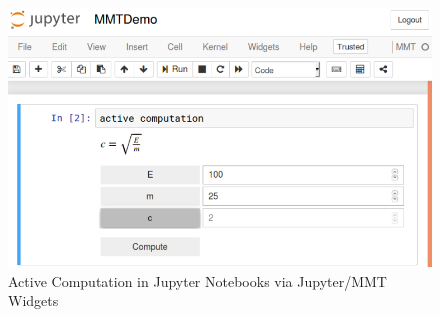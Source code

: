 \begin{figure}[ht]\centering
    \includegraphics[width=12cm]{activecomp}
    \caption{Active Computation in Jupyter Notebooks via Jupyter/MMT Widgets}\label{fig:ac}
  \end{figure}



